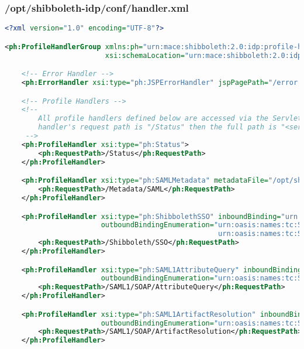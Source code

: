 \subsubsection{/opt/shibboleth-idp/conf/handler.xml}
\begin{lstlisting}[language=xml]
<?xml version="1.0" encoding="UTF-8"?>

<ph:ProfileHandlerGroup xmlns:ph="urn:mace:shibboleth:2.0:idp:profile-handler" xmlns:xsi="http://www.w3.org/2001/XMLSchema-instance"
                        xsi:schemaLocation="urn:mace:shibboleth:2.0:idp:profile-handler classpath:/schema/shibboleth-2.0-idp-profile-handler.xsd">

    <!-- Error Handler -->
    <ph:ErrorHandler xsi:type="ph:JSPErrorHandler" jspPagePath="/error.jsp"/>

    <!-- Profile Handlers -->
    <!--
        All profile handlers defined below are accessed via the Servlet path "/profile" so if your profile
        handler's request path is "/Status" then the full path is "<servletContextName>/profile/Status"
     -->
    <ph:ProfileHandler xsi:type="ph:Status">
        <ph:RequestPath>/Status</ph:RequestPath>
    </ph:ProfileHandler>

    <ph:ProfileHandler xsi:type="ph:SAMLMetadata" metadataFile="/opt/shibboleth-idp/metadata/idp-metadata.xml">
        <ph:RequestPath>/Metadata/SAML</ph:RequestPath>
    </ph:ProfileHandler>

    <ph:ProfileHandler xsi:type="ph:ShibbolethSSO" inboundBinding="urn:mace:shibboleth:1.0:profiles:AuthnRequest"
                       outboundBindingEnumeration="urn:oasis:names:tc:SAML:1.0:profiles:browser-post
                                                   urn:oasis:names:tc:SAML:1.0:profiles:artifact-01">
        <ph:RequestPath>/Shibboleth/SSO</ph:RequestPath>
    </ph:ProfileHandler>

    <ph:ProfileHandler xsi:type="ph:SAML1AttributeQuery" inboundBinding="urn:oasis:names:tc:SAML:1.0:bindings:SOAP-binding"
                       outboundBindingEnumeration="urn:oasis:names:tc:SAML:1.0:bindings:SOAP-binding">
        <ph:RequestPath>/SAML1/SOAP/AttributeQuery</ph:RequestPath>
    </ph:ProfileHandler>

    <ph:ProfileHandler xsi:type="ph:SAML1ArtifactResolution" inboundBinding="urn:oasis:names:tc:SAML:1.0:bindings:SOAP-binding"
                       outboundBindingEnumeration="urn:oasis:names:tc:SAML:1.0:bindings:SOAP-binding">
        <ph:RequestPath>/SAML1/SOAP/ArtifactResolution</ph:RequestPath>
    </ph:ProfileHandler>


\end{lstlisting}
